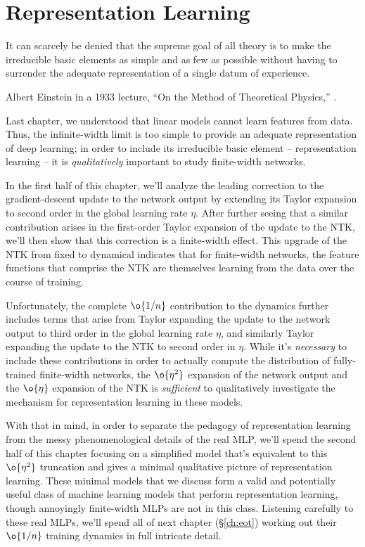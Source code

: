 

\chapter{Representation Learning}\label{ch:features}

\epigraph{It can scarcely be denied that the supreme goal of all theory is to make the irreducible basic elements as simple and as few as possible without having to surrender the adequate representation of a single datum of experience.}{Albert Einstein in 
a 1933 lecture, ``On the Method of Theoretical Physics,''  
\cite{einstein-simple}.}
\noindent{}Last chapter,  we understood that
linear models
cannot learn features from data. Thus, the infinite-width limit is too simple to provide an adequate representation of deep learning; in order to include its irreducible basic element -- representation learning -- it is \emph{qualitatively} important to study finite-width networks.


In the first half of this chapter,  we'll analyze the leading correction to the gradient-descent update to the network output by extending its Taylor expansion to second order in the global learning rate $\eta$. After further seeing that a similar contribution arises in the first-order Taylor expansion of the update to the NTK,  we'll then
show that this correction is a finite-width effect.
 This upgrade of the NTK from fixed to dynamical indicates that for finite-width networks, the feature functions that comprise the NTK are themselves learning from the data over the course of training.

Unfortunately, the complete $\o{1/n}$ contribution to the dynamics further includes terms that arise from Taylor expanding the update to the network output to third order in the global learning rate $\eta$, and similarly Taylor expanding the update to the NTK to second order in $\eta$. While it's \emph{necessary} to include these contributions in order to actually compute the distribution of fully-trained finite-width networks, the $\o{\eta^2}$ expansion of the network output and the $\o{\eta}$ expansion of the NTK is \emph{sufficient} to qualitatively investigate the mechanism for representation learning in these models.

With that in mind, in order to separate the pedagogy of representation learning from the messy phenomenological details of the real MLP, we'll spend the second half of this chapter focusing on a simplified model that's equivalent to this $\o{\eta^2}$ truncation and gives a minimal qualitative picture of representation learning. 
These minimal models that we discuss form a valid and potentially useful class of machine learning models that perform representation learning, though annoyingly finite-width MLPs are not in this class.
Listening carefully to these real MLPs, we'll spend all of next chapter (\S\ref{ch:eot}) working out their  $\o{1/n}$ training dynamics in full intricate detail.

